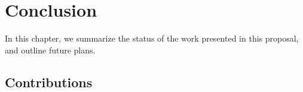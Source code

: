\chapter{Conclusion}
\label{chap:conclusion}

\if@ms
In this chapter, we summarize the status of the work presented in this proposal, and outline future plans.
\else
\fi

\section{Contributions}
\label{sec:conclusion:status}

\lipsum


